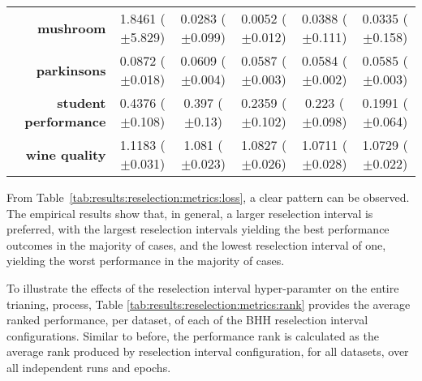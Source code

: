 \begin{table}[htb]
{\begin{tabular}{r|ccccc}
                  \textbf{mushroom}            & \cellcolor[rgb]{ .973,  .412,  .42}1.8461 ($\pm$5.829)       & \cellcolor[rgb]{ .886,  .886,  .51}0.0283 ($\pm$0.099)  & \cellcolor[rgb]{ .388,  .745,  .482}0.0052 ($\pm$0.012) & \cellcolor[rgb]{ 1,  .922,  .518}0.0388 ($\pm$0.111)    & \cellcolor[rgb]{ 1,  .922,  .518}0.0335 ($\pm$0.158)    \\
                  \textbf{parkinsons}          & \cellcolor[rgb]{ .973,  .412,  .42}0.0872 ($\pm$0.018)       & \cellcolor[rgb]{ 1,  .886,  .514}0.0609 ($\pm$0.004)    & \cellcolor[rgb]{ 1,  .922,  .518}0.0587 ($\pm$0.003)    & \cellcolor[rgb]{ .388,  .745,  .482}0.0584 ($\pm$0.002) & \cellcolor[rgb]{ .482,  .769,  .486}0.0585 ($\pm$0.003) \\
                  \textbf{student performance} & \cellcolor[rgb]{ .973,  .412,  .42}0.4376 ($\pm$0.108)       & \cellcolor[rgb]{ .98,  .518,  .443}0.397 ($\pm$0.13)    & \cellcolor[rgb]{ 1,  .922,  .518}0.2359 ($\pm$0.102)    & \cellcolor[rgb]{ .784,  .859,  .502}0.223 ($\pm$0.098)  & \cellcolor[rgb]{ .388,  .745,  .482}0.1991 ($\pm$0.064) \\
                  \textbf{wine quality}        & \cellcolor[rgb]{ .973,  .412,  .42}1.1183 ($\pm$0.031)       & \cellcolor[rgb]{ 1,  .922,  .518}1.081 ($\pm$0.023)     & \cellcolor[rgb]{ 1,  .898,  .514}1.0827 ($\pm$0.026)    & \cellcolor[rgb]{ .388,  .745,  .482}1.0711 ($\pm$0.028) & \cellcolor[rgb]{ .498,  .776,  .486}1.0729 ($\pm$0.022) \\
            \end{tabular}%
      }
\end{table}%

From Table~\ref{tab:results:reselection:metrics:loss}, a clear pattern can be observed. The empirical results show that, in general, a larger reselection interval is preferred, with the largest reselection intervals yielding the best performance outcomes in the majority of cases, and the lowest reselection interval of one, yielding the worst performance in the majority of cases.

To illustrate the effects of the reselection interval hyper-paramter on the entire trianing, process, Table \ref{tab:results:reselection:metrics:rank} provides the average ranked performance, per dataset, of each of the \acs{BHH} reselection interval configurations. Similar to before, the performance rank is calculated as the average rank produced by reselection interval configuration, for all datasets, over all independent runs and epochs.

